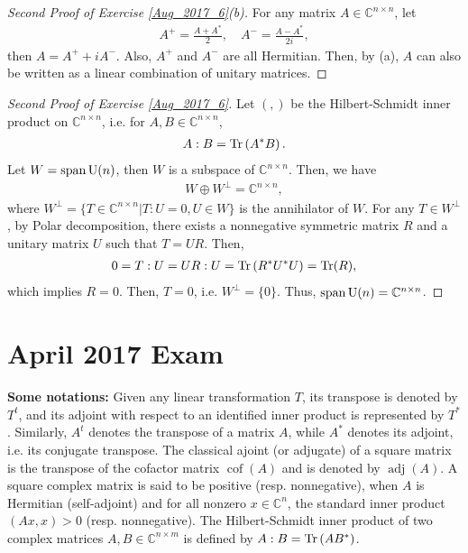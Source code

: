\documentclass[11pt]{article}
\theoremstyle{definition}
\numberwithin{equation}{subsection}
\begin{document}
\begin{proof}[Second Proof of Exercise \ref{Aug_2017_6}(b)]
For any matrix $A \in \mathbb{C}^{n \times n}$, let 
\begin{align*}
    A^+ = \frac{A + A^*}{2}, \quad A^{-} = \frac{A - A^*}{2i},
\end{align*}
then $A = A^+ + i A^{-}$. Also, $A^+$ and $A^{-}$ are all Hermitian. Then, by (a), $A$ can also be written as a linear combination of unitary matrices.
\end{proof}

\medskip

\begin{proof}[Second Proof of Exercise \ref{Aug_2017_6}]
Let $(,)$ be the Hilbert-Schmidt inner product on $\mathbb{C}^{n \times n}$, i.e. for $A, B \in \mathbb{C}^{n \times n}$, 
\begin{align*}
    A:B = \Tr\left(A^*B\right).
\end{align*}
Let $W = \operatorname{span} {\rm U}(n)$, then $W$ is a subspace of $\mathbb{C}^{n \times n}$. Then, we have
\begin{align*}
    W \oplus W^{\bot} = \mathbb{C}^{n \times n},
\end{align*}
where $W^{\bot} = \{T \in \mathbb{C}^{n \times n} | T:U = 0, U \in W\}$ is the annihilator of $W$. For any $T \in W^{\bot}$, by Polar decomposition, there exists a nonnegative symmetric matrix $R$ and a unitary matrix $U$ such that $T = UR$\cite{9}. Then,
\begin{align*}
    0 = T:U = UR:U = \Tr\left(R^*U^*U\right) = \Tr(R),
\end{align*}
which implies $R = 0$. Then, $T = 0$, i.e. $W^\bot = \{0\}$. Thus, $\operatorname{span} {\rm U}(n) = \mathbb{C}^{n \times n}$.
\end{proof}


\newpage
\section{April 2017 Exam}

{\bf Some notations:} Given any linear transformation $T$, its transpose is denoted by $T^t$, and its adjoint with respect to an identified inner product is represented by $T^*$. Similarly, $A^t$ denotes the transpose of a matrix $A$, while $A^*$ denotes its adjoint, i.e. its conjugate transpose. The classical ajoint (or adjugate) of a square matrix is the transpose of the cofactor matrix $\operatorname{cof}(A)$ and is denoted by $\operatorname{adj}(A)$. A square complex matrix is said to be positive (resp. nonnegative), when $A$ is Hermitian (self-adjoint) and for all nonzero $x \in \mathbb{C}^n$, the standard inner product $(Ax, x) > 0$ (resp. nonnegative). The Hilbert-Schmidt inner product of two complex matrices $A, B \in \mathbb{C}^{n \times m}$ is defined by $A : B = \Tr \left(AB^*\right)$.
\end{document}
